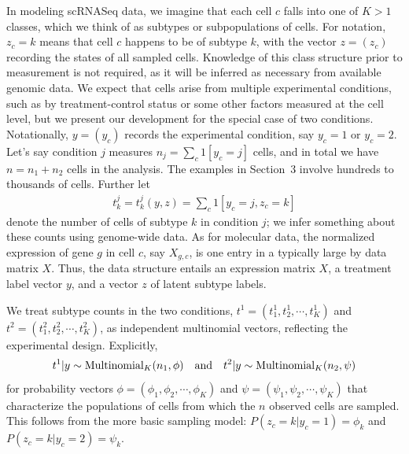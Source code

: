 \documentclass[aoas,preprint]{imsart}
\begin{document}
In modeling scRNASeq data, we
imagine that each cell $c$ falls into one of $K>1$ classes, which we think of as
subtypes or subpopulations of cells. For notation, $z_c=k$ means that cell $c$ happens to be of subtype $k$, with the vector $z=(z_c)$ recording
the states of all sampled cells.  Knowledge of this class structure
 prior to measurement is not required, as it will be inferred as necessary from
 available genomic data.   We expect that cells arise from multiple
experimental conditions, such as by treatment-control status or some other factors
 measured at the cell level, but we present our development for the special
case of two conditions.  Notationally, $y=(y_c)$ records the experimental condition, say $y_c=1$ or $y_c=2$.
 Let's say condition $j$ measures $n_j=\sum_{c} 1[y_c=j]$ cells,  and
in total we have $n=n_1+n_2$ cells in the analysis.  The examples in Section~3 involve hundreds to thousands of cells.
Further let \begin{eqnarray}
\label{eq:counts}
t^j_k = t^j_k(y,z) = \sum_c 1[y_c=j, z_c=k] 
\end{eqnarray}
denote the number of cells of subtype $k$ in condition $j$;
we infer something about these counts using genome-wide data.  As for molecular data, the 
normalized expression of gene $g$ in cell $c$, say $X_{g,c}$, is one entry
in a typically large {} by {} data matrix $X$.  Thus, the data structure entails an expression matrix
$X$, a treatment label vector $y$, and a vector $z$ of latent subtype labels.


We treat subtype counts in the two conditions,  $t^1 = (t^1_1, t^1_2, \cdots, t^1_K )$ and 
$t^2 = (t^2_1, t^2_2, \cdots, t^2_K)$,  as independent multinomial
vectors, reflecting the experimental design.  Explicitly,
\begin{eqnarray}
\label{eq:mult}
t^1| y \sim \text{Multinomial}_K( n_1, \phi ) \quad {\mbox {\rm and}} \quad
t^2| y \sim \text{Multinomial}_K( n_2, \psi )
\end{eqnarray}
for probability vectors 
$\phi = (\phi_1, \phi_2, \cdots, \phi_K)$ and 
 $\psi = ( \psi_1, \psi_2, \cdots, \psi_K)$ that characterize the populations of
cells from which the $n$ observed cells are sampled.  This follows from the more basic 
sampling model:
$P(z_c=k|y_c=1) = \phi_k$ and $P(z_c=k| y_c =2 ) = \psi_k.$
\end{document}
